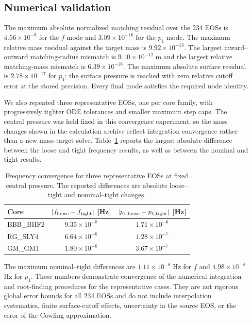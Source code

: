 \documentclass[aps,prd,twocolumn,superscriptaddress,nofootinbib]{revtex4-2}
\begin{document}
\subsection{Numerical validation}

The maximum absolute normalized matching residual over the 234 EOSs is $4.56\times10^{-8}$ for the $f$ mode and $3.09\times10^{-10}$ for the $p_1$ mode. The maximum relative mass residual against the target mass is $9.92\times10^{-13}$. The largest inward--outward matching-radius mismatch is $9.10\times10^{-12}$ m and the largest relative matching-mass mismatch is $6.39\times10^{-16}$. The maximum absolute surface residual is $2.78\times10^{-17}$ for $p_1$; the surface pressure is reached with zero relative cutoff error at the stored precision. Every final mode satisfies the required node identity.

We also repeated three representative EOSs, one per core family, with progressively tighter ODE tolerances and smaller maximum step caps. The central pressure was held fixed in this convergence experiment, so the mass changes shown in the calculation archive reflect integration convergence rather than a new mass-target solve. Table~\ref{tab:convergence} reports the largest absolute difference between the loose and tight frequency results, as well as between the nominal and tight results.

\begin{table}[b]
\caption{Frequency convergence for three representative EOSs at fixed central pressure. The reported differences are absolute loose--tight and nominal--tight changes.}
\label{tab:convergence}
\begin{ruledtabular}
\begin{tabular}{lcc}
Core & $|f_{\rm loose}-f_{\rm tight}|$ [Hz] & $|p_{1,\rm loose}-p_{1,\rm tight}|$ [Hz]\\
\midrule
BBB\_BHF2 & $9.35\times10^{-8}$ & $1.71\times10^{-6}$\\
RG\_SLY4  & $6.64\times10^{-8}$ & $1.28\times10^{-7}$\\
GM\_GM1   & $1.80\times10^{-8}$ & $3.67\times10^{-7}$\\
\end{tabular}
\end{ruledtabular}
\end{table}

The maximum nominal--tight differences are $1.11\times10^{-8}$ Hz for $f$ and $4.98\times10^{-8}$ Hz for $p_1$. These numbers demonstrate convergence of the numerical integration and root-finding procedures for the representative cases. They are not rigorous global error bounds for all 234 EOSs and do not include interpolation systematics, finite surface-cutoff effects, uncertainty in the source EOS, or the error of the Cowling approximation.
\end{document}
